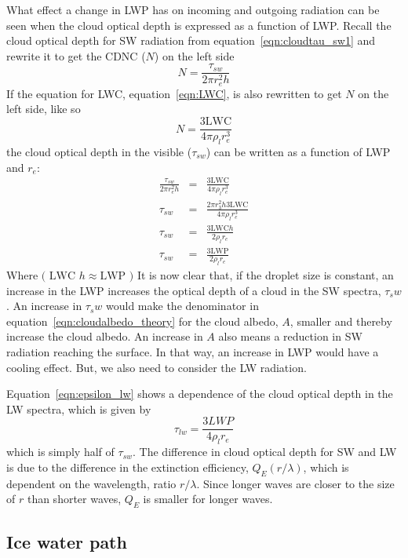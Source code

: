 What effect a change in LWP has on incoming and outgoing radiation can be seen when the cloud optical depth is expressed as a function of LWP. Recall the cloud optical depth for SW radiation from equation~\ref{eqn:cloudtau_sw1} and rewrite it to get the CDNC ($N$) on the left side
\begin{equation}
N = \frac{\tau_{sw}}{2\pi r^2_e h}
\end{equation}
If the equation for LWC, equation~\ref{eqn:LWC}, is also rewritten to get $N$ on the left side, like so
\begin{equation}
N = \frac{3\text{LWC}}{4\pi \rho_l r^3_e}
\end{equation}
the cloud optical depth in the visible ($\tau_{sw}$) can be written as a function of LWP and $r_e$:
\begin{eqnarray}
\frac{\tau_{sw}}{2\pi r^2_e h} &=& \frac{3\text{LWC}}{4\pi \rho_l r^3_e}\\
\tau_{sw} &=& \frac{2\pi r^2_3 h 3\text{LWC}}{4\pi \rho_l r^3_e}\\
\tau_{sw} &=& \frac{3\text{LWC} h}{2\rho_l r_e}\\
\tau_{sw} &=& \frac{3\text{LWP}}{2\rho_l r_e}
\label{eqn:cloudtau_sw}
\end{eqnarray}
Where $\text{( LWC }h \approx \text{LWP )}$
It is now clear that, if the droplet size is constant, an increase in the LWP increases the optical depth of a cloud in the SW spectra, $\tau_sw$. An increase in $\tau_sw$ would make the denominator in equation~\ref{eqn:cloudalbedo_theory} for the cloud albedo, $A$, smaller and thereby increase the cloud albedo. An increase in $A$ also means a reduction in SW radiation reaching the surface. In that way, an increase in LWP would have a cooling effect. But, we also need to consider the LW radiation. 

Equation~\ref{eqn:epsilon_lw} shows a dependence of the cloud optical depth in the LW spectra, which is given by
\begin{equation}
\tau_{lw} = \frac{3LWP}{4\rho_l r_e}
\label{eqn:tau_lw}
\end{equation}
which is simply half of $\tau_{sw}$. The difference in cloud optical depth for SW and LW is due to the difference in the extinction efficiency, $Q_E(r/\lambda)$, which is dependent on the wavelength, ratio $r/\lambda$. Since longer waves are closer to the size of $r$ than shorter waves, $Q_E$ is smaller for longer waves.


\subsection{Ice water path}

